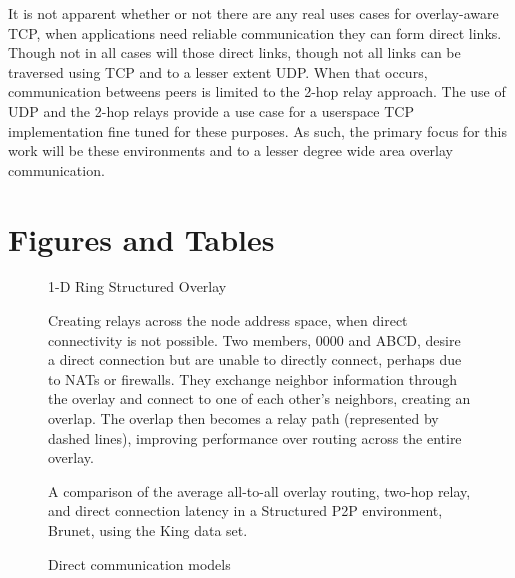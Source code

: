 It is not apparent whether or not there are any real uses cases for 
overlay-aware TCP, when applications need reliable communication they can form
direct links.  Though not in all cases will those direct links, though not
all links can be traversed using TCP and to a lesser extent UDP.  When that
occurs, communication betweens peers is limited to the 2-hop relay approach.
The use of UDP and the 2-hop relays provide a use case for a userspace TCP
implementation fine tuned for these purposes.  As such, the primary focus for
this work will be these environments and to a lesser degree wide area overlay
communication.

\section{Figures and Tables}

\begin{figure}[ht]
\centering
{}
\caption{1-D Ring Structured Overlay}
\label{fig:ring_overlay}
\end{figure}

\begin{figure}[ht]
\centering
{}
\caption[Proactive relay creation]{Creating relays across the node address
space, when direct connectivity is not possible.  Two members, 0000 and ABCD, 
desire a direct connection but are unable to directly connect, perhaps due to
NATs or firewalls.  They exchange neighbor information through the overlay and
connect to one of each other's neighbors, creating an overlap.  The overlap
then becomes a relay path (represented by dashed lines), improving performance
over routing across the entire overlay.}
\label{fig:relay}
\end{figure}

\begin{figure}[ht]
\centering
{}
\caption[Relay evaluation]{A comparison of the average all-to-all overlay
routing, two-hop relay, and direct connection latency in a Structured P2P
environment, Brunet, using the King data set.}
\label{fig:simulated_relays}
\end{figure}

\begin{figure}[ht]
\centering
\caption{Direct communication models}
\label{fig:direct_communication}
\end{figure}

\begin{table}[ht]
\caption{VN Stack Comparison}
\label{tab:vpn_eval_comp}
\centering
\end{table}
